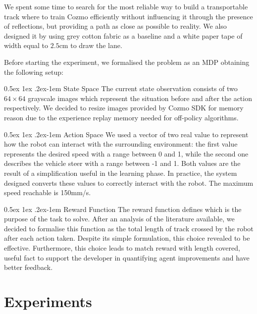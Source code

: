 \documentclass[10pt,twocolumn,letterpaper]{article}
\makeatletter
\renewcommand{\paragraph}{%
  \@startsection{paragraph}{4}%
  {\z@}{0.5ex \@plus 1ex \@minus .2ex}{-1em}%
  {\normalfont\normalsize\bfseries}%
}
\makeatother
\begin{document}
We spent some time to search for the most reliable way to build a transportable track where to train Cozmo efficiently without influencing it through the presence of reflections, but providing a path as close as possible to reality.
We also designed it by using grey cotton fabric as a baseline and a white paper tape of width equal to $2.5$cm to draw the lane.

Before starting the experiment, we formalised the problem as an MDP obtaining the following setup:

\paragraph{State Space} The current state observation consists of two $64 \times 64$ grayscale images which represent the situation before and after the action respectively.
We decided to resize images provided by Cozmo SDK for memory reason due to the experience replay memory needed for off-policy algorithms.

\paragraph{Action Space} We used a vector of two real value to represent how the robot can interact with the surrounding environment: the first value represents the desired speed with a range between 0 and 1, while the second one describes the vehicle steer with a range between -1 and 1.
Both values are the result of a simplification useful in the learning phase.
In practice, the system designed converts these values to correctly interact with the robot.
The maximum speed reachable is 150mm/s.

\paragraph{Reward Function} The reward function defines which is the purpose of the task to solve.
After an analysis of the literature available, we decided to formalise this function as the total length of track crossed by the robot after each action taken.
Despite its simple formulation, this choice revealed to be effective.
Furthermore, this choice leads to match reward with length covered, useful fact to support the developer in quantifying agent improvements and have better feedback.

\section{Experiments}
\end{document}
